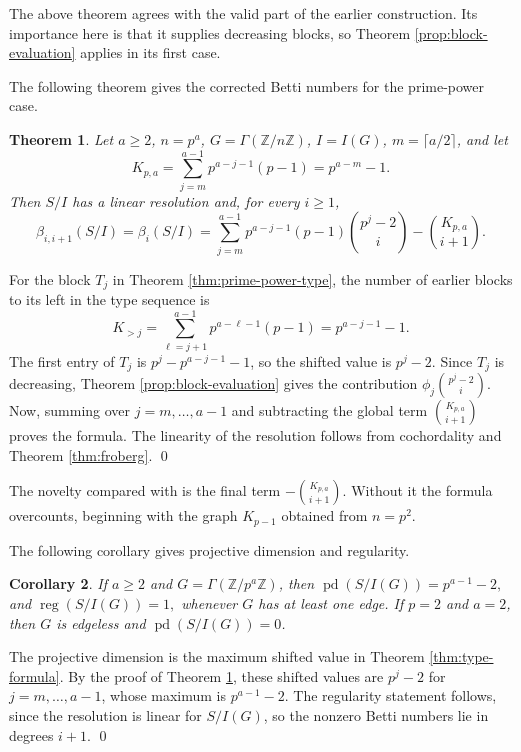\documentclass[12pt]{article}
\newtheorem{theorem}{Theorem}[section]
\newtheorem{corollary}[theorem]{Corollary}
\theoremstyle{definition}
\renewenvironment{proof}{{\bf \noindent Proof.}}{\qed}
\begin{document}
\medskip

The above theorem agrees with the valid part of the earlier construction.  Its importance here is that it supplies decreasing blocks, so Theorem \ref{prop:block-evaluation} applies in its first case.

\medskip

\noindent The following theorem gives the corrected Betti numbers for the prime-power case.
\begin{theorem}\label{thm:prime-power-betti}
Let $a\geq 2$, $n=p^a$, $G=\Gamma(\mathbb{Z}/n\mathbb{Z})$, $I=I(G)$, $m=\lceil a/2\rceil$, and let
$$
K_{p,a}=\sum_{j=m}^{a-1}p^{a-j-1}(p-1)=p^{a-m}-1.
$$
Then $S/I$ has a linear resolution and, for every $i\geq 1$,
$$
\beta_{i,i+1}(S/I)=\beta_i(S/I)=\sum_{j=m}^{a-1}p^{a-j-1}(p-1)\binom{p^j-2}{i}-\binom{K_{p,a}}{i+1}.
$$
\end{theorem}

\begin{proof}
For the block $T_j$ in Theorem \ref{thm:prime-power-type}, the number of earlier blocks to its left in the type sequence is
$$
K_{>j}=\sum_{\ell=j+1}^{a-1}p^{a-\ell-1}(p-1)=p^{a-j-1}-1.
$$
The first entry of $T_j$ is $p^j-p^{a-j-1}-1$, so the shifted value is $p^j-2$.  Since $T_j$ is decreasing, Theorem \ref{prop:block-evaluation} gives the contribution $\phi_j\binom{p^j-2}{i}$.  Now, summing over $j=m,\ldots,a-1$ and subtracting the global term $\binom{K_{p,a}}{i+1}$ proves the formula.  The linearity of the resolution follows from cochordality and Theorem \ref{thm:froberg}.
\end{proof}

\medskip

The novelty compared with \cite{DungVu2026} is the final term $-\binom{K_{p,a}}{i+1}$.  Without it the formula overcounts, beginning with the graph $K_{p-1}$ obtained from $n=p^2$.

\medskip

\noindent The following corollary gives projective dimension and regularity.
\begin{corollary}\label{cor:prime-power-pd}
If $a\geq 2$ and $G=\Gamma(\mathbb{Z}/p^a\mathbb{Z})$, then
$ \operatorname{pd}(S/I(G))=p^{a-1}-2,$ and $
\operatorname{reg}(S/I(G))=1, $
whenever $G$ has at least one edge.  If $p=2$ and $a=2$, then $G$ is edgeless and $\operatorname{pd}(S/I(G))=0$.
\end{corollary}

\begin{proof}
The projective dimension is the maximum shifted value in Theorem \ref{thm:type-formula}.  By the proof of Theorem  \ref{thm:prime-power-betti}, these shifted values are $p^j-2$ for $j=m,\ldots,a-1$, whose maximum is $p^{a-1}-2$.  The regularity statement follows, since the resolution is linear for $S/I(G)$, so the nonzero Betti numbers lie in degrees $i+1$.
\end{proof}
\end{document}
